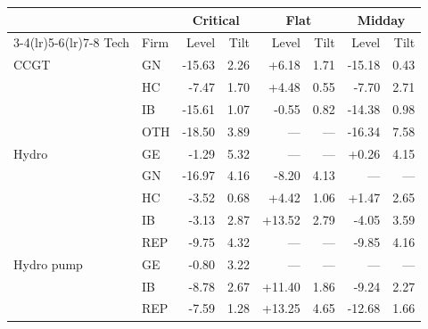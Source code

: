 \begin{tabular}{l l r r r r r r}
\toprule
 & & \multicolumn{2}{c}{Critical} & \multicolumn{2}{c}{Flat} & \multicolumn{2}{c}{Midday} \\
\cmidrule(lr){3-4}\cmidrule(lr){5-6}\cmidrule(lr){7-8}
Tech & Firm & Level & Tilt & Level & Tilt & Level & Tilt \\
\midrule
CCGT & GN & -15.63 & 2.26 & +6.18 & 1.71 & -15.18 & 0.43 \\
 & HC & -7.47 & 1.70 & +4.48 & 0.55 & -7.70 & 2.71 \\
 & IB & -15.61 & 1.07 & -0.55 & 0.82 & -14.38 & 0.98 \\
 & OTH & -18.50 & 3.89 & --- & --- & -16.34 & 7.58 \\
\addlinespace
Hydro & GE & -1.29 & 5.32 & --- & --- & +0.26 & 4.15 \\
 & GN & -16.97 & 4.16 & -8.20 & 4.13 & --- & --- \\
 & HC & -3.52 & 0.68 & +4.42 & 1.06 & +1.47 & 2.65 \\
 & IB & -3.13 & 2.87 & +13.52 & 2.79 & -4.05 & 3.59 \\
 & REP & -9.75 & 4.32 & --- & --- & -9.85 & 4.16 \\
\addlinespace
Hydro pump & GE & -0.80 & 3.22 & --- & --- & --- & --- \\
 & IB & -8.78 & 2.67 & +11.40 & 1.86 & -9.24 & 2.27 \\
 & REP & -7.59 & 1.28 & +13.25 & 4.65 & -12.68 & 1.66 \\
\bottomrule
\end{tabular}